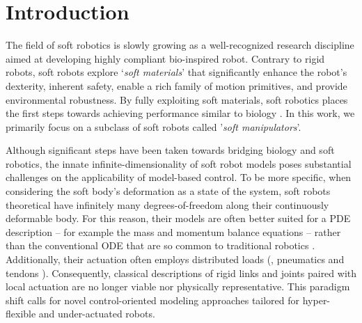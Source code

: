 \section{Introduction} \label{sec:chap3_introduction}
The field of soft robotics is slowly growing as a well-recognized research discipline aimed at developing highly compliant bio-inspired robot. Contrary to rigid robots, soft robots explore `\textit{soft materials}' that significantly enhance the robot's dexterity, inherent safety, enable a rich family of motion primitives, and provide environmental robustness. By fully exploiting soft materials, soft robotics places the first steps towards achieving performance similar to biology \cite{Choi2011,Falkenhahn2015,Marchese2014}. In this work, we primarily focus on a subclass of soft robots called '\textit{soft manipulators}'.

Although significant steps have been taken towards bridging biology and soft robotics, the innate infinite-dimensionality of soft robot models poses substantial challenges on the applicability of model-based control. To be more specific, when considering the soft body's deformation as a state of the system, soft robots theoretical have infinitely many degrees-of-freedom along their continuously deformable body. For this reason, their models are often better suited for a PDE description \cite{Duriez2013,Largilliere2015,Wu2021} -- for example the mass and momentum balance equations -- rather than the conventional ODE that are so common to traditional robotics \cite{Spong2006,Murray1994}. Additionally, their actuation often employs distributed loads (\eg, pneumatics \cite{Falkenhahn2015,Marchese2014} and tendons \cite{Till2019,Wu2021}). Consequently, classical descriptions of rigid links and joints paired with local actuation are no longer viable nor physically representative. This paradigm shift calls for novel control-oriented modeling approaches tailored for hyper-flexible and under-actuated robots.

